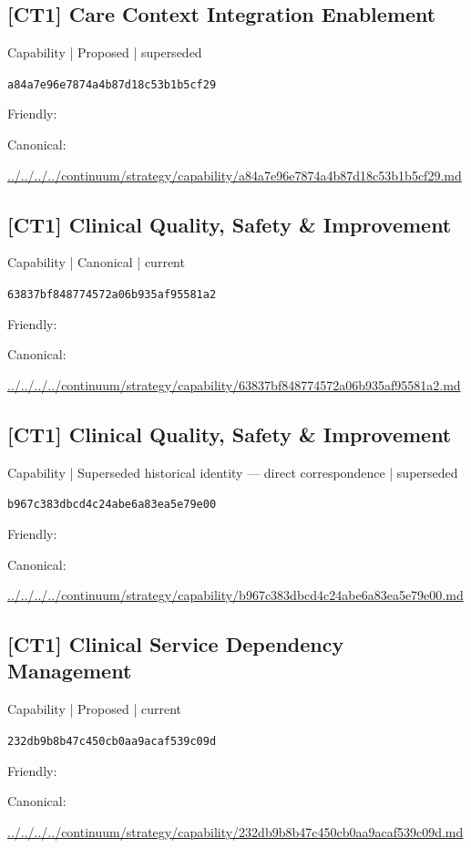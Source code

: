 \documentclass[10pt,a4paper]{article}
\begin{document}
\subsection*{[CT1] Care Context Integration Enablement}
{\small Capability | Proposed | superseded}\par
\texttt{a84a7e96e7874a4b87d18c53b1b5cf29}\par
Friendly: \par
Canonical: \par
{\footnotesize\url{../../../../continuum/strategy/capability/a84a7e96e7874a4b87d18c53b1b5cf29.md}}\par
\subsection*{[CT1] Clinical Quality, Safety \& Improvement}
{\small Capability | Canonical | current}\par
\texttt{63837bf848774572a06b935af95581a2}\par
Friendly: \par
Canonical: \par
{\footnotesize\url{../../../../continuum/strategy/capability/63837bf848774572a06b935af95581a2.md}}\par
\subsection*{[CT1] Clinical Quality, Safety \& Improvement}
{\small Capability | Superseded historical identity — direct correspondence | superseded}\par
\texttt{b967c383dbcd4c24abe6a83ea5e79e00}\par
Friendly: \par
Canonical: \par
{\footnotesize\url{../../../../continuum/strategy/capability/b967c383dbcd4c24abe6a83ea5e79e00.md}}\par
\subsection*{[CT1] Clinical Service Dependency Management}
{\small Capability | Proposed | current}\par
\texttt{232db9b8b47c450cb0aa9acaf539c09d}\par
Friendly: \par
Canonical: \par
{\footnotesize\url{../../../../continuum/strategy/capability/232db9b8b47c450cb0aa9acaf539c09d.md}}\par
\end{document}
